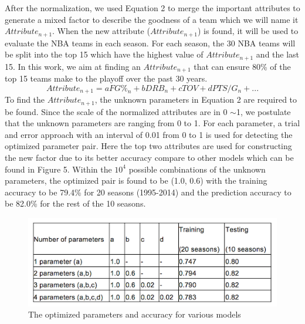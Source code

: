 \documentclass{acm_proc_article-sp}
\begin{document}
After the normalization, we used Equation 2 to merge the important attributes to generate a mixed factor to describe the goodness of a team which we will name it $Attribute_{n+1}$. When the new attribute ($Attribute_{n+1}$) is found, it will be used to evaluate the NBA teams in each season. For each season, the 30 NBA teams will be split into the top 15 which have the highest value of $Attribute_{n+1}$ and the last 15. In this work, we aim at finding an $Attribute_{n+1}$ that can ensure 80\% of the top 15 teams make to the playoff over the past 30 years.\\
\begin{equation}
Attribute_{n+1} = aFG\%_{n} + bDRB_{n} + cTOV + dPTS/G_{n} + ...
\end{equation}
To find the $Attribute_{n+1}$, the unknown parameters in Equation 2 are required to be found. Since the scale of the normalized attributes are in 0 $\sim$1, we postulate that the unknown parameters are ranging from 0 to 1. For each parameter, a trial and error approach with an interval of 0.01 from 0 to 1 is used for detecting the optimized parameter pair. Here the top two attributes are used for constructing the new factor due to its better accuracy compare to other models which can be found in Figure 5. Within the $10^{4}$ possible combinations of the unknown parameters, the optimized pair is found to be (1.0, 0.6) with the training accuracy to be 79.4\% for 20 seasons (1995-2014) and the prediction accuracy to be 82.0\% for the rest of the 10 seasons.\\
\begin{figure}[!htb]
\includegraphics{Accuracy.png}
\caption{The optimized parameters and accuracy for various models}
\end{figure}
\end{document}

